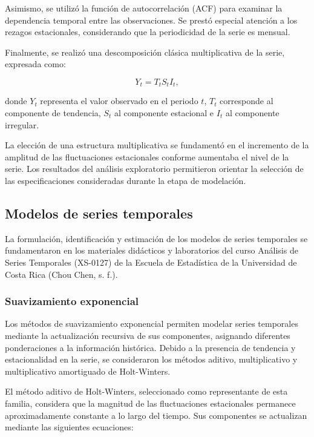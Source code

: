 \documentclass[12pt]{article}
\begin{document}
Asimismo, se utilizó la función de autocorrelación
(ACF) para examinar la dependencia temporal entre
las observaciones. Se prestó especial atención a
los rezagos estacionales, considerando que la
periodicidad de la serie es mensual.

Finalmente, se realizó una descomposición clásica
multiplicativa de la serie, expresada como:

\begin{equation}
    Y_t = T_t S_t I_t,
    \label{eq:descomposicion}
\end{equation}

donde $Y_t$ representa el valor observado en el
periodo $t$, $T_t$ corresponde al componente de
tendencia, $S_t$ al componente estacional e $I_t$
al componente irregular.

La elección de una estructura multiplicativa se
fundamentó en el incremento de la amplitud de las
fluctuaciones estacionales conforme aumentaba el
nivel de la serie. Los resultados del análisis
exploratorio permitieron orientar la selección de
las especificaciones consideradas durante la
etapa de modelación.

\subsection{Modelos de series temporales}

La formulación, identificación y estimación de los 
modelos de series temporales se fundamentaron en 
los materiales didácticos y laboratorios del curso 
Análisis de Series Temporales (XS-0127) de la Escuela 
de Estadística de la Universidad de Costa Rica 
(Chou Chen, s. f.).

\subsubsection{Suavizamiento exponencial}

Los métodos de suavizamiento exponencial permiten 
modelar series temporales mediante la actualización 
recursiva de sus componentes, asignando diferentes 
ponderaciones a la información histórica. Debido a la 
presencia de tendencia y estacionalidad en la serie, 
se consideraron los métodos aditivo, multiplicativo 
y multiplicativo amortiguado de Holt-Winters.

El método aditivo de Holt-Winters, seleccionado como
representante de esta familia, considera que la 
magnitud de las fluctuaciones estacionales permanece 
aproximadamente constante a lo largo del tiempo. Sus 
componentes se actualizan mediante las siguientes 
ecuaciones:
\end{document}
